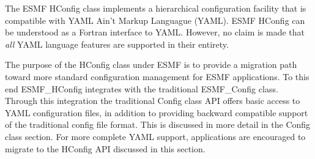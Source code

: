 %

\label{sec:HConfig}

The ESMF HConfig class implements a hierarchical configuration facility that is
compatible with YAML Ain't Markup Languague (YAML\texttrademark). ESMF HConfig
can be understood as a Fortran interface to YAML. However, no claim is made that
{\em all} YAML language features are supported in their entirety.

The purpose of the HConfig class under ESMF is to provide a migration path
toward more standard configuration management for ESMF applications. To this end
ESMF\_HConfig integrates with the traditional ESMF\_Config class. Through this
integration the traditional Config class API offers basic access to YAML
configuration files, in addition to providing backward compatible support of the
traditional config file format. This is discussed in more detail in the Config
class section. For more complete YAML support, applications are encouraged to
migrate to the HConfig API discussed in this section.

